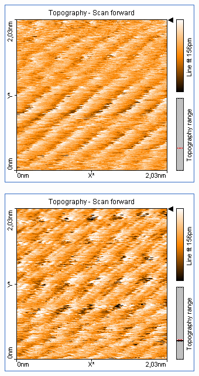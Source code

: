 \centering
\begin{figure}
    \begin{subfigure}[b]{\picwidth}
        \includegraphics[width=\textwidth]{data/Graphit/pic_06_07_3nm}
        \caption{}
        \label{fig:graphit_06_07}
    \end{subfigure}\qquad
    \begin{subfigure}[b]{\picwidth}
        \includegraphics[width=\textwidth]{data/Graphit/pic_06_08_3nm}

\end{subfigure}
\end{figure}
